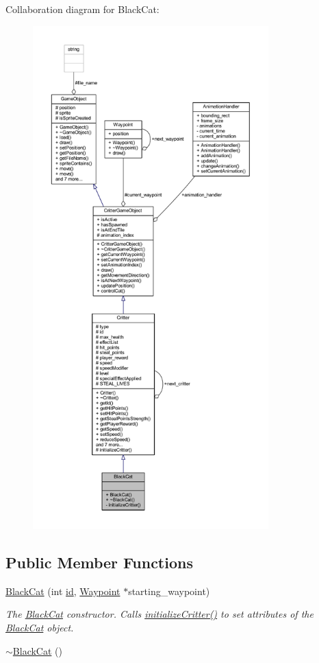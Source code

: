 Collaboration diagram for Black\+Cat\+:
\nopagebreak
\begin{figure}[H]
\begin{center}
\leavevmode
\includegraphics[height=550pt]{class_black_cat__coll__graph}
\end{center}
\end{figure}
\subsection*{Public Member Functions}
\begin{DoxyCompactItemize}
\item 
\hyperlink{class_black_cat_a7974aa98721932e53102c10484af1abe}{Black\+Cat} (int \hyperlink{class_critter_ae775e0ebe6e8bbe249c403670bda46f8}{id}, \hyperlink{class_waypoint}{Waypoint} $\ast$starting\+\_\+waypoint)
\begin{DoxyCompactList}\small\item\em The \hyperlink{class_black_cat}{Black\+Cat} constructor. Calls \hyperlink{class_black_cat_a2ae946e05f754f7d7bdbc753946425eb}{initialize\+Critter()} to set attributes of the \hyperlink{class_black_cat}{Black\+Cat} object. \end{DoxyCompactList}\item 
\hyperlink{class_black_cat_ae2d3786e829242eb070ce3adc41d7173}{$\sim$\+Black\+Cat} ()
\end{DoxyCompactItemize}

